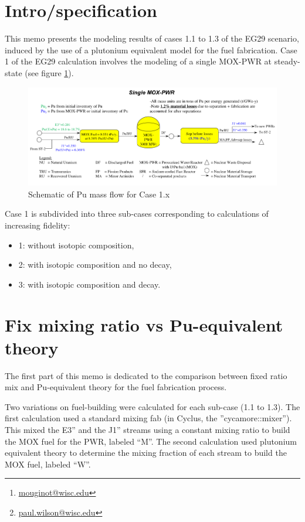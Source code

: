 \documentclass[12pt]{article}
\title{}
\author[1]{B. Mouginot  \thanks{\href{mailto:mouginot@wisc.edu}{mouginot@wisc.edu}}}
\author[1]{P.P.H. Wilson\thanks{\href{mailto:paul.wilson@wisc.edu}{paul.wilson@wisc.edu}}}
\author[1]{R. Carlsen}
\author[1]{A. Opotowsky}
\affil[1]{University of Wisconsin--Madison, Department of Engineering Physics, CNERG group}
\date{\today}
\begin{document}
\maketitle

\section{Intro/specification}

This memo presents the modeling results of cases 1.1 to 1.3 of the EG29
scenario, induced by the use of a plutonium equivalent model for the fuel
fabrication. Case 1 of the EG29 calculation involves the modeling of a single
MOX-PWR at steady-state (see figure \ref{fig:puflow}).

\begin{figure}[h!]
  \centering
  \includegraphics[width=1\textwidth]  {img/puflow}
  \caption{Schematic of Pu mass flow for Case 1.x}
  \label{fig:puflow}
\end{figure}

Case 1 is subdivided into three sub-cases corresponding to calculations of
increasing fidelity: 
\begin{itemize}
  \item	1: without isotopic composition, 
  \item 2: with isotopic composition and no decay,
  \item 3: with isotopic composition and decay.
\end{itemize}


\section{Fix mixing ratio vs Pu-equivalent theory}

The first part of this memo is dedicated to the comparison between fixed ratio
mix and Pu-equivalent theory for the fuel fabrication process.

Two variations on fuel-building were calculated for each sub-case (1.1 to 1.3).
The first calculation used a standard mixing fab (in Cyclus, the
''cycamore::mixer''). This mixed the E3” and the J1” streams using a constant mixing
ratio to build the MOX fuel for the PWR, labeled “M”. The second calculation
used plutonium equivalent theory to determine the mixing fraction of each stream
to build the MOX fuel, labeled “W”.
\end{document}
